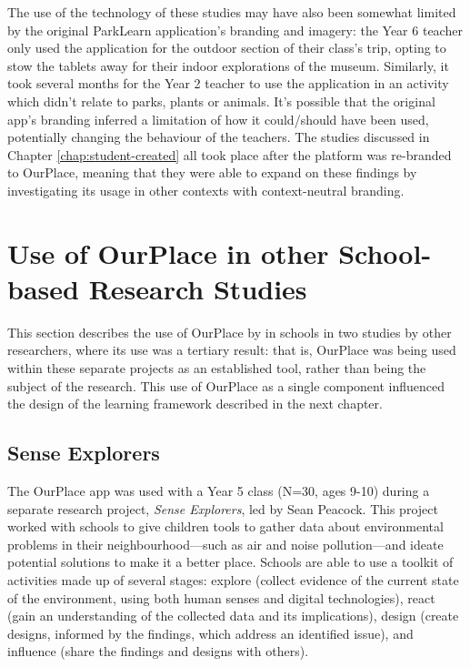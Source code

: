 The use of the technology of these studies may have also been somewhat limited by the original ParkLearn application's branding and imagery: the Year 6 teacher only used the application for the outdoor section of their class’s trip, opting to stow the tablets away for their indoor explorations of the museum. Similarly, it took several months for the Year 2 teacher to use the application in an activity which didn’t relate to parks, plants or animals. It's possible that the original app's branding inferred a limitation of how it could/should have been used, potentially changing the behaviour of the teachers. The studies discussed in Chapter \ref{chap:student-created} all took place after the platform was re-branded to OurPlace, meaning that they were able to expand on these findings by investigating its usage in other contexts with context-neutral branding.

\section{Use of OurPlace in other School-based Research Studies}
This section describes the use of OurPlace by in schools in two studies by other researchers, where its use was a tertiary result: that is, OurPlace was being used within these separate projects as an established tool, rather than being the subject of the research. This use of OurPlace as a single component influenced the design of the learning framework described in the next chapter.

\subsection{Sense Explorers}
\label{sec:SenseExplorers}

The OurPlace app was used with a Year 5 class (N=30, ages 9-10) during a separate research project, \textit{Sense Explorers}, led by Sean Peacock. This project worked with schools to give children tools to gather data about environmental problems in their neighbourhood---such as air and noise pollution---and ideate potential solutions to make it a better place. Schools are able to use a toolkit of activities made up of several stages: explore (collect evidence of the current state of the environment, using both human senses and digital technologies), react (gain an understanding of the collected data and its implications), design (create designs, informed by the findings, which address an identified issue), and influence (share the findings and designs with others). 

